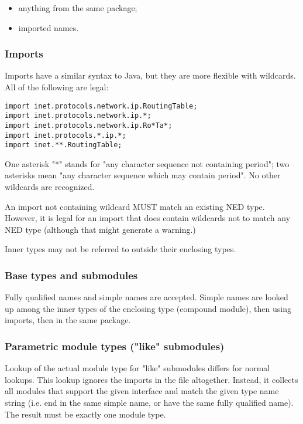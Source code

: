 \begin{itemize}
  \item anything from the same package;
  \item imported names.
\end{itemize}

\subsubsection{Imports}

Imports have a similar syntax to Java, but they are more flexible with wildcards.
All of the following are legal:
\begin{verbatim}
import inet.protocols.network.ip.RoutingTable;
import inet.protocols.network.ip.*;
import inet.protocols.network.ip.Ro*Ta*;
import inet.protocols.*.ip.*;
import inet.**.RoutingTable;
\end{verbatim}

One asterisk "*" stands for "any character sequence not containing
period"; two asterisks mean "any character sequence which may
contain period". No other wildcards are recognized.

An import not containing wildcard MUST match an existing NED type.
However, it is legal for an import that does contain wildcards
not to match any NED type (although that might generate a warning.)

Inner types may not be referred to outside their enclosing types.

\subsubsection{Base types and submodules}

Fully qualified names and simple names are accepted. Simple names
are looked up among the inner types of the enclosing type (compound
module), then using imports, then in the same package.


\subsubsection{Parametric module types ("like" submodules)}

Lookup of the actual module type for "like" submodules differs for normal
lookups. This lookup ignores the imports in the file altogether.
Instead, it collects all modules that support the given interface
and match the given type name string (i.e. end in the same simple name,
or have the same fully qualified name). The result must be exactly
one module type.

